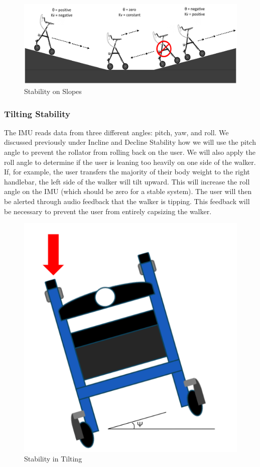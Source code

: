 \begin{figure}[H]
	\centering
	\includegraphics[width=\textwidth]{./Images/Incline-Decline-Stability.png}
	\caption{\label{fig:slope-stability}Stability on Slopes}
\end{figure}

\subsubsection{Tilting Stability}
\noindent The IMU reads data from three different angles: pitch, yaw, and roll. We discussed previously under Incline and Decline Stability how we will use the pitch angle to prevent the rollator from rolling back on the user. We will also apply the roll angle to determine if the user is leaning too heavily on one side of the walker. If, for example, the user transfers the majority of their body weight to the right handlebar, the left side of the walker will tilt upward. This will increase the roll angle on the IMU (which should be zero for a stable system). The user will then be alerted through audio feedback that the walker is tipping. This feedback will be necessary to prevent the user from entirely capsizing the walker.\\

\begin{figure}[H]
	\centering
	\includegraphics[width=.4\textwidth]{./Images/roll2.png}
	\caption{\label{fig:roll}Stability in Tilting}
\end{figure}

